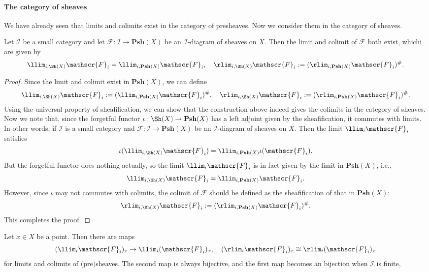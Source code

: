 \paragraph{The category of sheaves}
We have already seen that limits and colimits exist in the category of presheaves. Now we consider them in the category of sheaves.
\begin{proposition}
Let $\mathcal{I}$ be a small category and let $\mathscr{F}:\mathcal{I}\to\mathbf{Psh}(X)$ be an $\mathcal{I}$-diagram of sheaves on $X$. Then the limit and colimit of $\mathscr{F}$ both exist, whichi are given by
\[\llim_{i,\Sh(X)}\mathscr{F}_i=\llim_{i,\mathbf{Psh}(X)}\mathscr{F}_i,\quad \rlim_{i,\Sh(X)}\mathscr{F}_i:=(\rlim_{i,\mathbf{Psh}(X)}\mathscr{F}_i)^{\#}.\]
\end{proposition}
\begin{proof}
Since the limit and colimit exist in $\mathbf{Psh}(X)$, we can define
\[\llim_{i,\Sh(X)}\mathscr{F}_i:=(\llim_{i,\mathbf{Psh}(X)}\mathscr{F}_i)^{\#},\quad \rlim_{i,\Sh(X)}\mathscr{F}_i:=(\rlim_{i,\mathbf{Psh}(X)}\mathscr{F}_i)^{\#}.\]
Using the universal property of sheafification, we can show that the construction above indeed gives the colimits in the category of sheaves. Now we note that, since the forgetful functor $\iota:\Sh(X)\to\mathbf{Psh}(X)$ has a left adjoint given by the sheafification, it commutes with limits. In other words, if $\mathcal{I}$ is a small category and $\mathscr{F}:\mathcal{I}\to\mathbf{Psh}(X)$ be an $\mathcal{I}$-diagram of sheaves on $X$. Then the limit $\llim_i\mathscr{F}_i$ satisfies
\[\iota(\llim_{i,\Sh(X)}\mathscr{F}_i)=\llim_{i,\mathbf{Psh}(X)}\iota(\mathscr{F}_i).\]
But the forgetful functor does nothing actually, so the limit $\llim_i\mathscr{F}_i$ is in fact given by the limit in $\mathbf{Psh}(X)$, i.e.,
\[\llim_{i,\Sh(X)}\mathscr{F}_i=\llim_{i,\mathbf{Psh}(X)}\mathscr{F}_i.\]
However, since $\iota$ may not commutes with colimits, the colimit of $\mathscr{F}$ should be defined as the sheafification of that in $\mathbf{Psh}(X)$:
\[\rlim_{i,\Sh(X)}\mathscr{F}_i:=(\rlim_{i,\mathbf{Psh}(X)}\mathscr{F}_i)^{\#}.\]
This completes the proof.
\end{proof}
\begin{proposition}
Let $x\in X$ be a point. Then there are maps
\[(\llim_i\mathscr{F}_i)_x\to\llim_i(\mathscr{F}_i)_x,\quad (\rlim_i\mathscr{F}_i)_x\cong\rlim_i(\mathscr{F}_i)_x\]
for limits and colimits of $($pre$)$sheaves. The second map is always bijective, and the first map becomes an bijection when $\mathcal{I}$ is finite,
\end{proposition}
